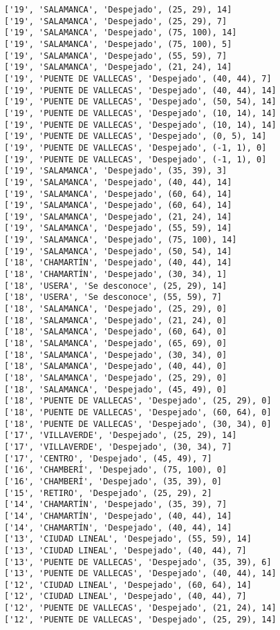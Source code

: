 \documentclass[11pt]{article}
\begin{document}
\begin{Verbatim}[commandchars=\\\{\}]
['19', 'SALAMANCA', 'Despejado', (25, 29), 14]
['19', 'SALAMANCA', 'Despejado', (25, 29), 7]
['19', 'SALAMANCA', 'Despejado', (75, 100), 14]
['19', 'SALAMANCA', 'Despejado', (75, 100), 5]
['19', 'SALAMANCA', 'Despejado', (55, 59), 7]
['19', 'SALAMANCA', 'Despejado', (21, 24), 14]
['19', 'PUENTE DE VALLECAS', 'Despejado', (40, 44), 7]
['19', 'PUENTE DE VALLECAS', 'Despejado', (40, 44), 14]
['19', 'PUENTE DE VALLECAS', 'Despejado', (50, 54), 14]
['19', 'PUENTE DE VALLECAS', 'Despejado', (10, 14), 14]
['19', 'PUENTE DE VALLECAS', 'Despejado', (10, 14), 14]
['19', 'PUENTE DE VALLECAS', 'Despejado', (0, 5), 14]
['19', 'PUENTE DE VALLECAS', 'Despejado', (-1, 1), 0]
['19', 'PUENTE DE VALLECAS', 'Despejado', (-1, 1), 0]
['19', 'SALAMANCA', 'Despejado', (35, 39), 3]
['19', 'SALAMANCA', 'Despejado', (40, 44), 14]
['19', 'SALAMANCA', 'Despejado', (60, 64), 14]
['19', 'SALAMANCA', 'Despejado', (60, 64), 14]
['19', 'SALAMANCA', 'Despejado', (21, 24), 14]
['19', 'SALAMANCA', 'Despejado', (55, 59), 14]
['19', 'SALAMANCA', 'Despejado', (75, 100), 14]
['19', 'SALAMANCA', 'Despejado', (50, 54), 14]
['18', 'CHAMARTÍN', 'Despejado', (40, 44), 14]
['18', 'CHAMARTÍN', 'Despejado', (30, 34), 1]
['18', 'USERA', 'Se desconoce', (25, 29), 14]
['18', 'USERA', 'Se desconoce', (55, 59), 7]
['18', 'SALAMANCA', 'Despejado', (25, 29), 0]
['18', 'SALAMANCA', 'Despejado', (21, 24), 0]
['18', 'SALAMANCA', 'Despejado', (60, 64), 0]
['18', 'SALAMANCA', 'Despejado', (65, 69), 0]
['18', 'SALAMANCA', 'Despejado', (30, 34), 0]
['18', 'SALAMANCA', 'Despejado', (40, 44), 0]
['18', 'SALAMANCA', 'Despejado', (25, 29), 0]
['18', 'SALAMANCA', 'Despejado', (45, 49), 0]
['18', 'PUENTE DE VALLECAS', 'Despejado', (25, 29), 0]
['18', 'PUENTE DE VALLECAS', 'Despejado', (60, 64), 0]
['18', 'PUENTE DE VALLECAS', 'Despejado', (30, 34), 0]
['17', 'VILLAVERDE', 'Despejado', (25, 29), 14]
['17', 'VILLAVERDE', 'Despejado', (30, 34), 7]
['17', 'CENTRO', 'Despejado', (45, 49), 7]
['16', 'CHAMBERÍ', 'Despejado', (75, 100), 0]
['16', 'CHAMBERÍ', 'Despejado', (35, 39), 0]
['15', 'RETIRO', 'Despejado', (25, 29), 2]
['14', 'CHAMARTÍN', 'Despejado', (35, 39), 7]
['14', 'CHAMARTÍN', 'Despejado', (40, 44), 14]
['14', 'CHAMARTÍN', 'Despejado', (40, 44), 14]
['13', 'CIUDAD LINEAL', 'Despejado', (55, 59), 14]
['13', 'CIUDAD LINEAL', 'Despejado', (40, 44), 7]
['13', 'PUENTE DE VALLECAS', 'Despejado', (35, 39), 6]
['13', 'PUENTE DE VALLECAS', 'Despejado', (40, 44), 14]
['12', 'CIUDAD LINEAL', 'Despejado', (60, 64), 14]
['12', 'CIUDAD LINEAL', 'Despejado', (40, 44), 7]
['12', 'PUENTE DE VALLECAS', 'Despejado', (21, 24), 14]
['12', 'PUENTE DE VALLECAS', 'Despejado', (25, 29), 14]

\end{Verbatim}
\end{document}
